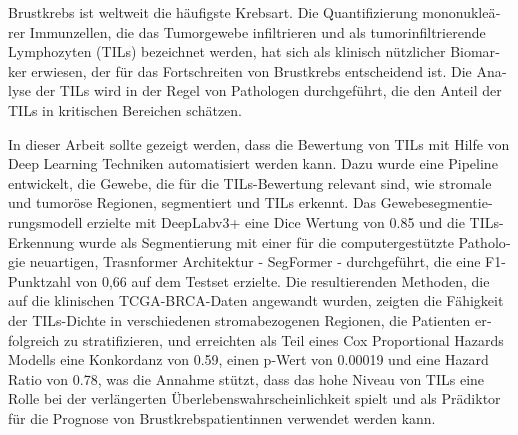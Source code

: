 \begin{otherlanguage}{ngerman} 
Brustkrebs ist weltweit die häufigste Krebsart.
Die Quantifizierung mononukleärer Immunzellen, die das Tumorgewebe infiltrieren
und als tumorinfiltrierende Lymphozyten (TILs) bezeichnet werden, hat sich als
klinisch nützlicher Biomarker erwiesen, der für das Fortschreiten von Brustkrebs entscheidend ist.
Die Analyse der TILs wird in der Regel von Pathologen durchgeführt, die den Anteil der
TILs in kritischen Bereichen schätzen.

In dieser Arbeit sollte gezeigt werden, dass die Bewertung von TILs mit Hilfe von
Deep Learning Techniken automatisiert werden kann. Dazu wurde eine Pipeline entwickelt,
die Gewebe, die für die TILs-Bewertung relevant sind, wie stromale und tumoröse Regionen,
segmentiert und TILs erkennt. Das Gewebesegmentierungsmodell erzielte mit DeepLabv3+ eine
Dice Wertung von 0.85 und die TILs-Erkennung wurde als Segmentierung mit einer für die
computergestützte Pathologie neuartigen, Trasnformer Architektur - SegFormer - durchgeführt,
die eine F1-Punktzahl von 0,66 auf dem Testset erzielte. Die resultierenden Methoden,
die auf die klinischen TCGA-BRCA-Daten angewandt wurden, zeigten die Fähigkeit der
TILs-Dichte in verschiedenen stromabezogenen Regionen, die Patienten erfolgreich zu
stratifizieren, und erreichten als Teil eines Cox Proportional Hazards Modells eine
Konkordanz von 0.59, einen p-Wert von 0.00019 und eine Hazard Ratio von 0.78, was die
Annahme stützt, dass das hohe Niveau von TILs eine Rolle bei der verlängerten
Überlebenswahrscheinlichkeit spielt und als Prädiktor für die Prognose von
Brustkrebspatientinnen verwendet werden kann.

\end{otherlanguage}


\makeatletter
{}
{\renewcommand{\abstractname}{Abstract}}
{\renewcommand{\abstractname}{Kurzfassung}}
\makeatother